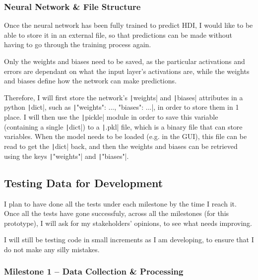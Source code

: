 \documentclass[12pt]{report}
\newcommand{\pil}[1]{\texttt|#1|}
\begin{document}
\subsubsection{Neural Network \& File Structure}
Once the neural network has been fully trained to predict HDI, I would like to be able to store it in an external file, so that predictions can be made without having to go through the training process again.

Only the weights and biases need to be saved, as the particular activations and errors are dependant on what the input layer's activations are, while the weights and biases define how the network can make predictions.

Therefore, I will first store the network's \pil{weights} and \pil{biases} attributes in a python \pil{dict}, such as \texttt|{"weights": ..., "biases": ...}|, in order to store them in 1 place. I will then use the \pil{pickle} module in order to save this variable (containing a single \pil{dict}) to a \pil{.pkl} file, which is a binary file that can store variables. When the model needs to be loaded (e.g. in the GUI), this file can be read to get the \pil{dict} back, and then the weights and biases can be retrieved using the keys \pil{"weights"} and \pil{"biases"}.

\subsection{Testing Data for Development}
I plan to have done all the tests under each milestone by the time I reach it. Once all the tests have gone successfuly, across all the milestones (for this prototype), I will ask for my stakeholders' opinions, to see what needs improving.

I will still be testing code in small increments as I am developing, to ensure that I do not make any silly mistakes.
\subsubsection{Milestone 1 -- Data Collection \& Processing}
\begin{center}
\end{center}
\end{document}
